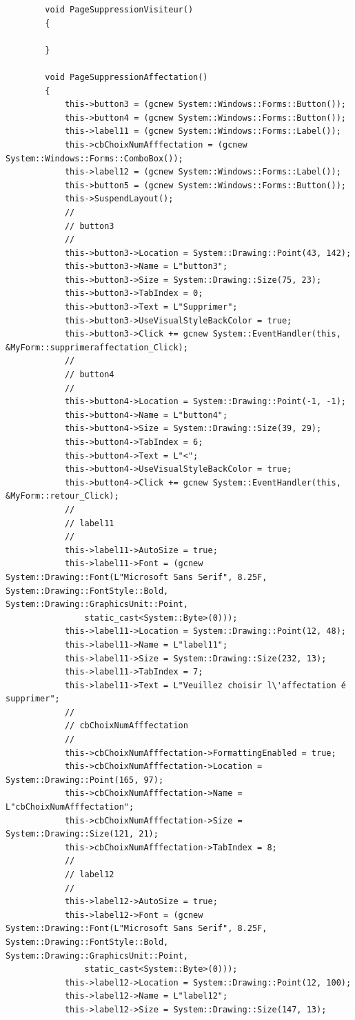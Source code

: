 \documentclass[main.tex]{subfiles}
\begin{document}
\begin{lstlisting}
		void PageSuppressionVisiteur()
		{

		}

		void PageSuppressionAffectation()
		{
			this->button3 = (gcnew System::Windows::Forms::Button());
			this->button4 = (gcnew System::Windows::Forms::Button());
			this->label11 = (gcnew System::Windows::Forms::Label());
			this->cbChoixNumAfffectation = (gcnew System::Windows::Forms::ComboBox());
			this->label12 = (gcnew System::Windows::Forms::Label());
			this->button5 = (gcnew System::Windows::Forms::Button());
			this->SuspendLayout();
			// 
			// button3
			// 
			this->button3->Location = System::Drawing::Point(43, 142);
			this->button3->Name = L"button3";
			this->button3->Size = System::Drawing::Size(75, 23);
			this->button3->TabIndex = 0;
			this->button3->Text = L"Supprimer";
			this->button3->UseVisualStyleBackColor = true;
			this->button3->Click += gcnew System::EventHandler(this, &MyForm::supprimeraffectation_Click);
			// 
			// button4
			// 
			this->button4->Location = System::Drawing::Point(-1, -1);
			this->button4->Name = L"button4";
			this->button4->Size = System::Drawing::Size(39, 29);
			this->button4->TabIndex = 6;
			this->button4->Text = L"<";
			this->button4->UseVisualStyleBackColor = true;
			this->button4->Click += gcnew System::EventHandler(this, &MyForm::retour_Click);
			// 
			// label11
			// 
			this->label11->AutoSize = true;
			this->label11->Font = (gcnew System::Drawing::Font(L"Microsoft Sans Serif", 8.25F, System::Drawing::FontStyle::Bold, System::Drawing::GraphicsUnit::Point,
				static_cast<System::Byte>(0)));
			this->label11->Location = System::Drawing::Point(12, 48);
			this->label11->Name = L"label11";
			this->label11->Size = System::Drawing::Size(232, 13);
			this->label11->TabIndex = 7;
			this->label11->Text = L"Veuillez choisir l\'affectation é supprimer";
			// 
			// cbChoixNumAfffectation
			// 
			this->cbChoixNumAfffectation->FormattingEnabled = true;
			this->cbChoixNumAfffectation->Location = System::Drawing::Point(165, 97);
			this->cbChoixNumAfffectation->Name = L"cbChoixNumAfffectation";
			this->cbChoixNumAfffectation->Size = System::Drawing::Size(121, 21);
			this->cbChoixNumAfffectation->TabIndex = 8;
			// 
			// label12
			// 
			this->label12->AutoSize = true;
			this->label12->Font = (gcnew System::Drawing::Font(L"Microsoft Sans Serif", 8.25F, System::Drawing::FontStyle::Bold, System::Drawing::GraphicsUnit::Point,
				static_cast<System::Byte>(0)));
			this->label12->Location = System::Drawing::Point(12, 100);
			this->label12->Name = L"label12";
			this->label12->Size = System::Drawing::Size(147, 13);

\end{lstlisting}
\end{document}
